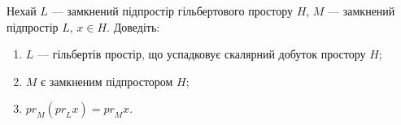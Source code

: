 \begin{exercise}
    Нехай $L$ --- замкнений підпростір гільбертового простору $H$, $M$ --- замкнений підпростір $L$, $x \in H$.
    Доведіть:
    \begin{enumerate}[label=\ukr*)]
        \item $L$ --- гільбертів простір, що успадковує скалярний добуток простору $H$;
        \item $M$ є замкненим підпростором $H$;
        \item ${pr}_M({pr}_L x) = {pr}_M x$.
    \end{enumerate}
\end{exercise}